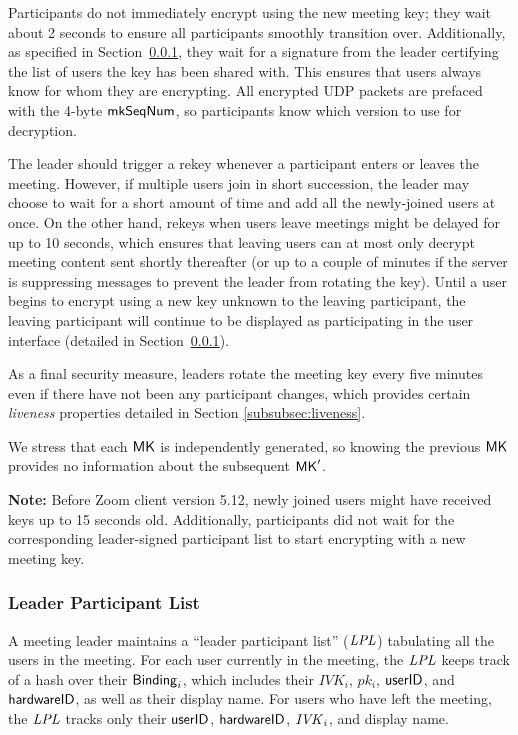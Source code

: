 Participants do not immediately encrypt using the new meeting key; they wait about 2
seconds to ensure all participants smoothly transition over. Additionally, as specified in Section~\ref{subsubsec:lpl}, they wait
for a signature from the leader certifying the list of users the key has been shared with. This ensures that users always know for whom
they are encrypting. All encrypted UDP packets are prefaced
with the 4-byte $\mathsf{mkSeqNum}$, so participants know which version to use for decryption.

The leader should trigger a rekey whenever a participant enters or leaves the meeting. However,
if multiple users join in short succession, the leader may choose to wait for a short amount of time
and add all the newly-joined users at once. On
the other hand, rekeys when users leave meetings might be delayed for up to 10 seconds,
which ensures that leaving users can at most only decrypt meeting content sent
shortly thereafter (or up to a couple of minutes if the
server is suppressing messages to prevent the leader from rotating the key).
Until a user begins to encrypt using a new key unknown to the leaving
participant, the leaving participant will continue to be displayed as participating
in the user interface (detailed in Section~\ref{subsubsec:lpl}).

As a final security measure, leaders rotate the meeting key every five minutes even if there have not
been any participant changes, which provides certain \textit{liveness} properties detailed in Section \ref{subsubsec:liveness}.

We stress that each ${\sf MK}$ is independently generated, so knowing the previous ${\sf MK}$ provides
no information about the subsequent ${\sf MK}'$.

\textbf{Note: } Before Zoom client version 5.12, newly joined users might have received keys up to 15 seconds old. Additionally, participants did not wait for the corresponding leader-signed participant list to start encrypting with a new meeting key.

\subsubsection{Leader Participant List}\label{subsubsec:lpl} A meeting leader maintains a ``leader
participant list'' ($\mathit{LPL}$) tabulating all the users in the meeting. For each user currently in the
meeting, the $\mathit{LPL}$ keeps track of a hash over their ${\sf Binding}_i$, which includes their $IVK_i$,
$pk_i$, $\mathsf{userID}$, and ${\sf hardwareID}$, as well as their display name. For users who have left the
meeting, the $\mathit{LPL}$ tracks only their $\mathsf{userID}$, ${\sf hardwareID}$, $\mathit{IVK}_i$, and display name.

